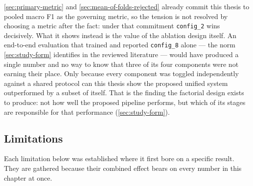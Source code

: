 \autoref{sec:primary-metric} and \autoref{sec:mean-of-folds-rejected} already commit this thesis to pooled macro F1 as the governing metric, so the tension is not resolved by choosing a metric after the fact: under that commitment \texttt{config\_2} wins decisively. What it shows instead is the value of the ablation design itself. An end-to-end evaluation that trained and reported \texttt{config\_8} alone --- the norm \autoref{sec:study-form} identifies in the reviewed literature --- would have produced a single number and no way to know that three of its four components were not earning their place. Only because every component was toggled independently against a shared protocol can this thesis show the proposed unified system outperformed by a subset of itself. That is the finding the factorial design exists to produce: not how well the proposed pipeline performs, but which of its stages are responsible for that performance (\autoref{sec:study-form}).

\subsection{Limitations}
\label{sec:ch5-limitations}

Each limitation below was established where it first bore on a specific result. They are gathered because their combined effect bears on every number in this chapter at once.

